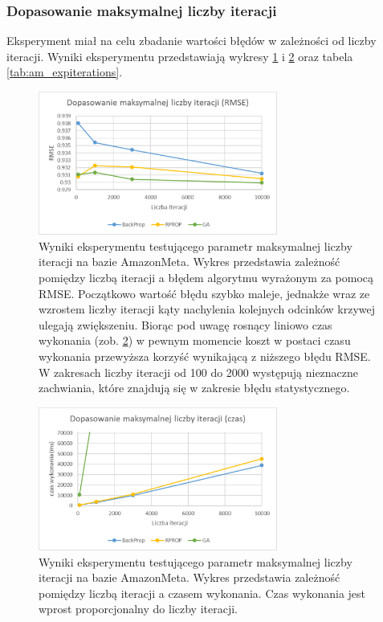 \documentclass[twoside]{iisthesis}
\begin{document}
			\subsubsection{Dopasowanie maksymalnej liczby iteracji}
			
			Eksperyment miał na celu zbadanie wartości błędów w zależności od liczby iteracji. Wyniki eksperymentu przedstawiają wykresy \ref{fig:am_expiterations_rmse} i \ref{fig:am_expiterations_time} oraz tabela \ref{tab:am_expiterations}.  
			
			\begin{figure}[!ht]
				\centering
				\includegraphics[width=0.7\textwidth]{am_expiterations_rmse}		
				\caption{Wyniki eksperymentu testującego parametr maksymalnej liczby iteracji na bazie AmazonMeta. Wykres przedstawia zależność pomiędzy liczbą iteracji a błędem algorytmu wyrażonym za pomocą RMSE. Początkowo wartość błędu szybko maleje, jednakże wraz ze wzrostem liczby iteracji kąty nachylenia kolejnych odcinków krzywej ulegają zwiększeniu. Biorąc pod uwagę rosnący liniowo czas wykonania (zob. \ref{fig:am_expiterations_time}) w pewnym momencie koszt w postaci czasu wykonania przewyższa korzyść wynikającą z niższego błędu RMSE. W zakresach liczby iteracji od 100 do 2000 występują nieznaczne zachwiania, które znajdują się w zakresie błędu statystycznego. }
				\label{fig:am_expiterations_rmse}
			\end{figure}
			
			\begin{figure}[!ht]
				\centering
				\includegraphics[width=0.7\textwidth]{am_expiterations_time}			
				\caption{Wyniki eksperymentu testującego parametr maksymalnej liczby iteracji na bazie AmazonMeta. Wykres przedstawia zależność pomiędzy liczbą iteracji a czasem wykonania. Czas wykonania jest wprost proporcjonalny do liczby iteracji. }
				\label{fig:am_expiterations_time}
			\end{figure}
		
\end{document}
